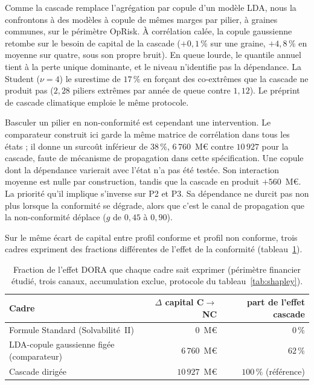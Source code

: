 Comme la cascade remplace l'agrégation par copule d'un modèle LDA, nous la confrontons à des modèles à copule
de mêmes marges par pilier, à graines communes, sur le périmètre OpRisk. À corrélation
calée, la copule gaussienne retombe sur le besoin de capital de la cascade ($+0{,}1\,\%$ sur une graine,
$+4{,}8\,\%$ en moyenne sur quatre, sous son propre bruit). En queue lourde, le quantile annuel
tient à la perte unique dominante, et le niveau n'identifie pas la dépendance. La Student
($\nu = 4$) le surestime de $17\,\%$ en forçant des co-extrêmes que la cascade ne produit pas
($2{,}28$ piliers extrêmes par année de queue contre $1{,}12$). Le préprint de cascade climatique
\citep{ccrn2026} emploie le même protocole.

Basculer un pilier en non-conformité est cependant une intervention. Le comparateur construit ici
garde la même matrice de corrélation dans tous les états ; il donne un surcoût inférieur de
$38\,\%$, $6\,760$~M\euro{} contre $10\,927$ pour la cascade, faute de mécanisme de propagation dans
cette spécification. Une copule dont la dépendance varierait avec l'état n'a pas été testée. Son interaction moyenne est nulle par construction, tandis que la
cascade en produit $+560$~M\euro{}. La priorité qu'il implique s'inverse sur P2 et P3. Sa dépendance
ne durcit pas non plus lorsque la conformité se dégrade, alors que c'est le canal de propagation que la non-conformité
déplace ($g$ de $0{,}45$ à $0{,}90$).

\label{sec:regard-reglementaire}%
Sur le même écart de capital entre profil conforme et profil non conforme, trois cadres expriment des
fractions différentes de l'effet de la conformité (tableau~\ref{tab:benchmark-sf}).

\begin{table}[H]\centering\small
\renewcommand{\arraystretch}{1.25}
\begin{tabular}{@{}l r r@{}}
\toprule
\textbf{Cadre} & \textbf{$\Delta$ capital C$\to$NC} & \textbf{part de l'effet cascade} \\
\midrule
Formule Standard (Solvabilité~II) & $0$~M\euro{} & $0\,\%$ \\
LDA-copule gaussienne figée (comparateur) & $6\,760$~M\euro{} & $62\,\%$ \\
Cascade dirigée & $10\,927$~M\euro{} & $100\,\%$ (référence) \\
\bottomrule
\end{tabular}
\caption{Fraction de l'effet DORA que chaque cadre sait exprimer (périmètre financier étudié, trois
canaux, accumulation exclue, protocole du tableau~\ref{tab:shapley}).}
\label{tab:benchmark-sf}
\end{table}

